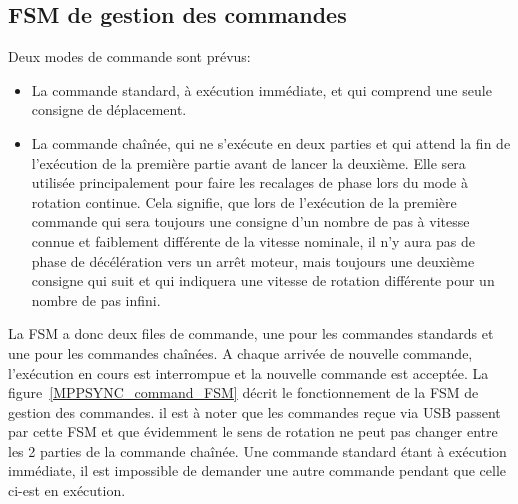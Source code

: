 \documentclass[11pt,a4paper,oneside,onecolumn]{article}
\begin{document}
\subsection{FSM de gestion des commandes}
Deux modes de commande sont prévus:
\begin{itemize}
 \item La commande standard, à exécution immédiate, et qui comprend une seule consigne de déplacement.
 \item La commande chaînée, qui ne s'exécute en deux parties et qui attend la fin de l'exécution de la première partie avant de lancer la deuxième. Elle sera utilisée principalement pour faire les recalages de phase lors du mode à rotation continue. Cela signifie, que lors de l'exécution de la première commande qui sera toujours une consigne d'un nombre de pas à vitesse connue et faiblement différente de la vitesse nominale, il n'y aura pas de phase de décélération vers un arrêt moteur, mais toujours une deuxième consigne qui suit et qui indiquera une vitesse de rotation différente pour un nombre de pas infini.
\end{itemize}


La FSM a donc deux files de commande, une pour les commandes standards et une pour les commandes chaînées. 
A chaque arrivée de nouvelle commande, l'exécution en cours est interrompue et la nouvelle commande est acceptée.
La figure~\ref{MPPSYNC_command_FSM} décrit le fonctionnement de la FSM de gestion des commandes. il est à noter que les commandes reçue via USB passent par cette FSM et que évidemment le sens de rotation ne peut pas changer entre les 2 parties de la commande chaînée. Une commande standard étant à exécution immédiate, il est impossible de demander une autre commande pendant que celle ci-est en exécution.
\end{document}
